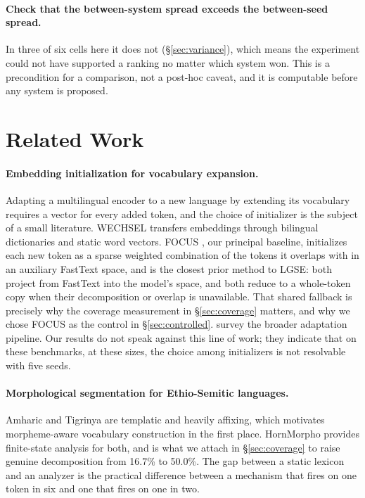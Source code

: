 \documentclass[11pt]{article}
\begin{document}
\paragraph{Check that the between-system spread exceeds the between-seed
spread.} In three of six cells here it does not (\S\ref{sec:variance}), which
means the experiment could not have supported a ranking no matter which system
won. This is a precondition for a comparison, not a post-hoc caveat, and it is
computable before any system is proposed.

\section{Related Work}

\paragraph{Embedding initialization for vocabulary expansion.} Adapting a
multilingual encoder to a new language by extending its vocabulary requires a
vector for every added token, and the choice of initializer is the subject of
a small literature. WECHSEL \citep{minixhofer-etal-2022-wechsel} transfers
embeddings through bilingual dictionaries and static word vectors. FOCUS
\citep{dobler-de-melo-2023-focus}, our principal baseline, initializes each
new token as a sparse weighted combination of the tokens it overlaps with in
an auxiliary FastText space, and is the closest prior method to LGSE: both
project from FastText into the model's space, and both reduce to a
whole-token copy when their decomposition or overlap is unavailable. That
shared fallback is precisely why the coverage measurement in
\S\ref{sec:coverage} matters, and why we chose FOCUS as the control in
\S\ref{sec:controlled}. \citet{csaki-etal-2023-efficiently} survey the
broader adaptation pipeline. Our results do not speak against this line of
work; they indicate that on these benchmarks, at these sizes, the choice among
initializers is not resolvable with five seeds.

\paragraph{Morphological segmentation for Ethio-Semitic languages.}
Amharic and Tigrinya are templatic and heavily affixing, which motivates
morpheme-aware vocabulary construction in the first place. HornMorpho
\citep{gasser-2011-hornmorpho} provides finite-state analysis for both, and
is what we attach in \S\ref{sec:coverage} to raise genuine decomposition from
16.7\% to 50.0\%. The gap between a static lexicon and an analyzer is the
practical difference between a mechanism that fires on one token in six and
one that fires on one in two.
\end{document}
